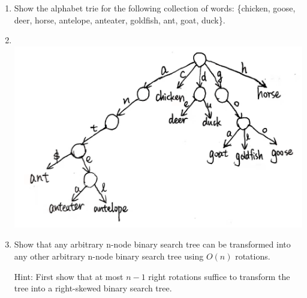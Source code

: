 \documentclass[12pt,a4paper]{article}
\makeatletter
\newtheorem*{solution}{Solution}
\theoremstyle{definition}
\renewenvironment{solution}[1][Solution] {\par\pushQED{\qed}\normalfont\topsep6\p@\@plus6\p@\relax\trivlist\item[\hskip\labelsep\bfseries#1\@addpunct{.}]\ignorespaces}{\popQED\endtrivlist\@endpefalse} \makeatother
\makeatother
\begin{document}
\begin{enumerate}
\item  Show the alphabet trie for the following collection of words: \{chicken, goose, deer, horse, antelope, anteater, goldfish, ant, goat, duck\}.

\begin{solution}
\quad\\
\includegraphics[scale=0.17]{p2.jpg}
\end{solution}

\item  Show that any arbitrary n-node binary search tree can be transformed into any other arbitrary n-node binary search tree using $O(n)$ rotations. 

	{\color{blue} Hint: First show that at most $n - 1$ right rotations suffice to transform the tree into a right-skewed binary
search tree.}


\end{enumerate}
\end{document}
